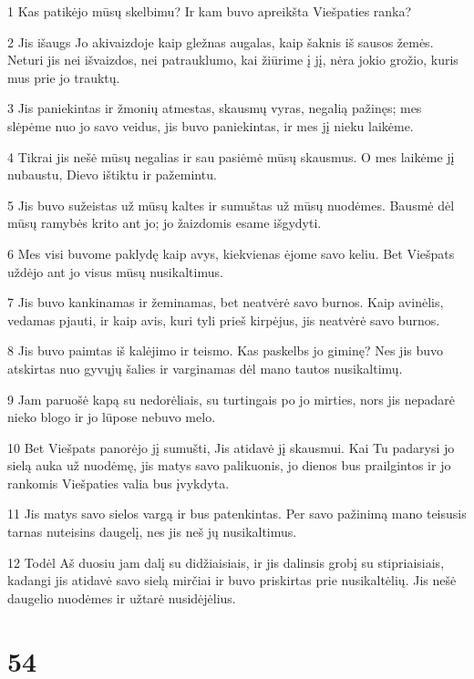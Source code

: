 \par 1 Kas patikėjo mūsų skelbimu? Ir kam buvo apreikšta Viešpaties ranka? 
\par 2 Jis išaugs Jo akivaizdoje kaip gležnas augalas, kaip šaknis iš sausos žemės. Neturi jis nei išvaizdos, nei patrauklumo, kai žiūrime į jį, nėra jokio grožio, kuris mus prie jo trauktų. 
\par 3 Jis paniekintas ir žmonių atmestas, skausmų vyras, negalią pažinęs; mes slėpėme nuo jo savo veidus, jis buvo paniekintas, ir mes jį nieku laikėme. 
\par 4 Tikrai jis nešė mūsų negalias ir sau pasiėmė mūsų skausmus. O mes laikėme jį nubaustu, Dievo ištiktu ir pažemintu. 
\par 5 Jis buvo sužeistas už mūsų kaltes ir sumuštas už mūsų nuodėmes. Bausmė dėl mūsų ramybės krito ant jo; jo žaizdomis esame išgydyti. 
\par 6 Mes visi buvome paklydę kaip avys, kiekvienas ėjome savo keliu. Bet Viešpats uždėjo ant jo visus mūsų nusikaltimus. 
\par 7 Jis buvo kankinamas ir žeminamas, bet neatvėrė savo burnos. Kaip avinėlis, vedamas pjauti, ir kaip avis, kuri tyli prieš kirpėjus, jis neatvėrė savo burnos. 
\par 8 Jis buvo paimtas iš kalėjimo ir teismo. Kas paskelbs jo giminę? Nes jis buvo atskirtas nuo gyvųjų šalies ir varginamas dėl mano tautos nusikaltimų. 
\par 9 Jam paruošė kapą su nedorėliais, su turtingais po jo mirties, nors jis nepadarė nieko blogo ir jo lūpose nebuvo melo. 
\par 10 Bet Viešpats panorėjo jį sumušti, Jis atidavė jį skausmui. Kai Tu padarysi jo sielą auka už nuodėmę, jis matys savo palikuonis, jo dienos bus prailgintos ir jo rankomis Viešpaties valia bus įvykdyta. 
\par 11 Jis matys savo sielos vargą ir bus patenkintas. Per savo pažinimą mano teisusis tarnas nuteisins daugelį, nes jis neš jų nusikaltimus. 
\par 12 Todėl Aš duosiu jam dalį su didžiaisiais, ir jis dalinsis grobį su stipriaisiais, kadangi jis atidavė savo sielą mirčiai ir buvo priskirtas prie nusikaltėlių. Jis nešė daugelio nuodėmes ir užtarė nusidėjėlius.



\chapter{54}


